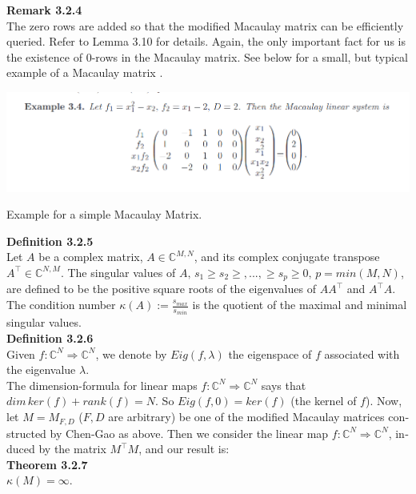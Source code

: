 \documentclass[a4paper,11pt]{article}
\begin{document}
\begin{otherlanguage}{english}
\noindent
\textbf{Remark 3.2.4} \\
The zero rows are added so that the modified Macaulay matrix can be efficiently queried. Refer to Lemma 3.10 for details. Again, the only important fact for us is the existence of $0$-rows in the Macaulay matrix. 
See below for a small, but typical example of a Macaulay matrix \cite{BDM}. \\

\begin{figurehere}
  \centering
  \includegraphics[width=14cm]{Macaulay.png}
  \caption{Example for a simple Macaulay Matrix.\label{abb_1}}
\end{figurehere}
\vspace{0.3cm}

\noindent
\textbf{Definition 3.2.5} \\
Let $A$ be a complex matrix, $A \in \mathbb{C}^{M,N}$, and its complex conjugate transpose $A^\intercal \in \mathbb{C}^{N,M}$. The singular values of $A, \, s_1 \geq s_2 \geq,...,\geq s_p \geq 0, \, p = min(M,N)$, are defined to be the positive square roots of the eigenvalues of $AA^\intercal$ and $A^\intercal A$. The condition number $\kappa(A) := \frac{s_{max}}{s_{min}}$ is the quotient of the maximal and minimal singular values. \\

\noindent
\textbf{Definition 3.2.6} \\
Given $f: \mathbb{C}^N \Rightarrow \mathbb{C}^N$, we denote by $Eig(f,\lambda)$ the eigenspace of $f$ associated with the eigenvalue $\lambda$. \\

\noindent
The dimension-formula for linear maps $f: \mathbb{C}^N \Rightarrow \mathbb{C}^N$ says that $dim \, ker(f) + rank(f) = N$. So $Eig(f,0) = ker(f)$ (the kernel of $f$). Now, let $M = M_{F,D}$ ($F,D$ are arbitrary) be one of the modified Macaulay matrices constructed by Chen-Gao as above. Then we consider the linear map $f: \mathbb{C}^N \Rightarrow \mathbb{C}^N$, induced by the matrix $M^\intercal M$, and our result is: \\

\noindent
\textbf{Theorem 3.2.7} \\
$\kappa(M)=\infty$. \\


\end{otherlanguage}
\end{document}
